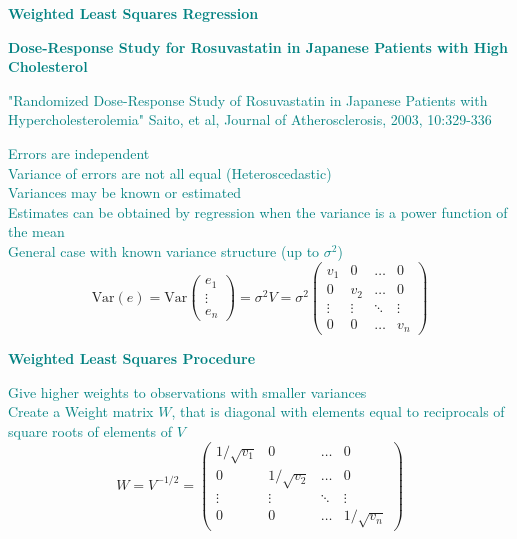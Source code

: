 \documentclass[14pt]{extarticle}
\begin{document}
\begin{center}
\textbf{\textcolor{teal}{Weighted Least Squares Regression}}

\vspace{1em}
\textbf{\textcolor{teal}{Dose-Response Study for Rosuvastatin in Japanese Patients with High Cholesterol}}

\vspace{2em}
\textcolor{teal}{"Randomized Dose-Response Study of Rosuvastatin in Japanese Patients with Hypercholesterolemia" Saito, et al, Journal of Atherosclerosis, 2003, 10:329-336}
\end{center}
\noindent
\textcolor{teal}{
Errors are independent \\
Variance of errors are not all equal (Heteroscedastic) \\
Variances may be known or estimated \\
Estimates can be obtained by regression when the variance is a power function of the mean \\
General case with known variance structure (up to $\sigma^2$)
}
\[
\text{Var}(e) = \text{Var} \begin{pmatrix} e_1 \\ \vdots \\ e_n \end{pmatrix} = \sigma^2 V = \sigma^2 \begin{pmatrix} v_1 & 0 & \dots & 0 \\ 0 & v_2 & \dots & 0 \\ \vdots & \vdots & \ddots & \vdots \\ 0 & 0 & \dots & v_n \end{pmatrix}
\]
\begin{center}
\textbf{\textcolor{teal}{Weighted Least Squares Procedure}}
\end{center}
\noindent
\textcolor{teal}{
Give higher weights to observations with smaller variances \\
Create a Weight matrix \( W \), that is diagonal with elements equal to reciprocals of square roots of elements of \( V \)
}
\[
W = V^{-1/2} = \begin{pmatrix} 1 / \sqrt{v_1} & 0 & \dots & 0 \\ 0 & 1 / \sqrt{v_2} & \dots & 0 \\ \vdots & \vdots & \ddots & \vdots \\ 0 & 0 & \dots & 1 / \sqrt{v_n} \end{pmatrix}
\]
\end{document}
